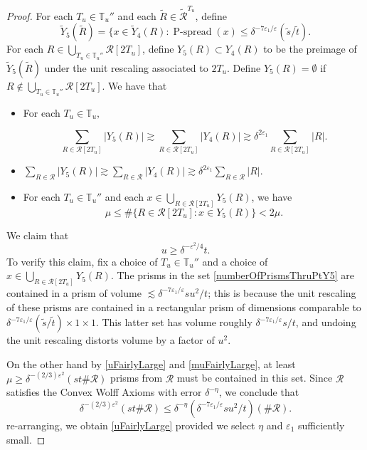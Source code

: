\documentclass[letterpaper, reqno,11pt]{article}
\numberwithin{equation}{section}
\newcommand{\eps}{\varepsilon}
\newcommand{\tubes}{\mathbb{T}}
\numberwithin{thm}{section}
\theoremstyle{remark}
\begin{document}
\begin{proof}
For each $T_u\in\tubes_u''$ and each $\tilde R\in\tilde{\mathcal{R}}^{T_u}$, define  
\[
\tilde Y_5(\tilde R)=\{x\in \tilde Y_4(R)\colon \operatorname{P-spread}(x)\leq \delta^{-7\eps_1/\eps}(\tilde s/\tilde t).
\]
For each $R\in\bigcup_{T_u\in\tubes_u''}\mathcal{R}[2T_u]$, define $Y_5(R)\subset Y_4(R)$ to be the preimage of $\tilde Y_5(\tilde R)$ under the unit rescaling associated to $2T_u$. Define $Y_5(R) = \emptyset$ if $R\not\in \bigcup_{T_u\in\tubes_u''}\mathcal{R}[2T_u]$. We have that 
\begin{itemize}
	\item For each $T_u\in\tubes_u,$ 

	\begin{equation}\label{densityOfY5}
	\sum_{R\in\mathcal{R}[2T_u]}|Y_5(R)|\gtrsim\sum_{R\in\mathcal{R}[2T_u]}|Y_4(R)|\gtrsim \delta^{2\eps_1}\sum_{R\in\mathcal{R}[2T_u]}|R|.
	\end{equation}
	\item $\sum_{R\in\mathcal{R}}|Y_5(R)|\gtrsim\sum_{R\in\mathcal{R}}|Y_4(R)|\gtrsim \delta^{2\eps_1}\sum_{R\in\mathcal{R}}|R|.$
	\item For each $T_u\in\tubes_u''$ and each $x\in\bigcup_{R\in\mathcal{R}[2T_u]}Y_5(R)$, we have
		\begin{equation}\label{numberOfPrismsThruPtY5}
		\mu\leq \#\{R\in\mathcal{R}[2T_u]\colon x\in Y_5(R)\}<2\mu.
		\end{equation}
\end{itemize}
We claim that 
\begin{equation}\label{uFairlyLarge}
u \geq \delta^{-\eps^2/4}t.
\end{equation}
To verify this claim, fix a choice of $T_u\in\tubes_u''$ and a choice of $x\in \bigcup_{R\in\mathcal{R}[2T_u]}Y_5(R)$. The prisms in the set
\eqref{numberOfPrismsThruPtY5} are contained in a prism of volume $\lesssim \delta^{-7\eps_1/\eps} s u^2/t$; this is because the unit rescaling of these prisms are contained in a rectangular prism of dimensions comparable to $\delta^{-7\eps_1/\eps} (\tilde s/\tilde t)\times 1\times 1$. This latter set has volume roughly $\delta^{-7\eps_1/\eps} s/t$, and undoing the unit rescaling distorts volume by a factor of $u^2$.

On the other hand by \eqref{uFairlyLarge} and \eqref{muFairlyLarge}, at least $\mu\geq \delta^{-(2/3)\eps^2}(st\#\mathcal{R})$ prisms from $\mathcal{R}$ must be contained in this set. Since $\mathcal{R}$ satisfies the Convex Wolff Axioms with error $\delta^{-\eta}$, we conclude that 
\[
\delta^{-(2/3)\eps^2}(st\#\mathcal{R}) \leq \delta^{-\eta}(\delta^{-7\eps_1/\eps}s u^2/t) (\#\mathcal{R}).
\]
re-arranging, we obtain \eqref{uFairlyLarge} provided we select $\eta$ and $\eps_1$ sufficiently small.



\end{proof}
\end{document}
